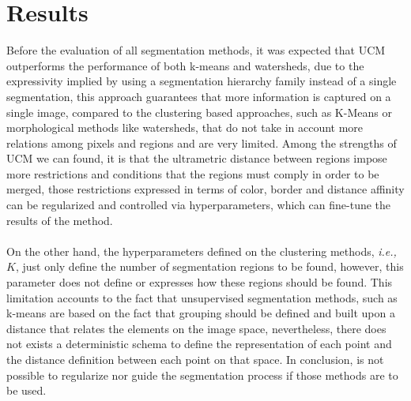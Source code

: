 \documentclass[10pt,twocolumn,letterpaper]{article}
\begin{document}
\section{Results}
Before the evaluation of all segmentation methods, it was expected that UCM outperforms the performance of both k-means and watersheds, due to the expressivity implied by using a segmentation hierarchy family instead of a single segmentation, this approach guarantees that more information is captured on a single image, compared to the clustering based approaches, such as K-Means or morphological methods like watersheds, that do not take in account more relations among pixels and regions and are very limited. Among the strengths of UCM we can found, it is that the ultrametric distance between regions impose more restrictions and conditions that the regions must comply in order to be merged, those restrictions expressed in terms of color, border and distance affinity can be regularized and controlled via hyperparameters, which can fine-tune the results of the method.
\\
\\
On the other hand, the hyperparameters defined on the clustering methods, \textit{i.e.,} $K$, just only define the number of segmentation regions to be found, however, this parameter does not define or expresses how these regions should be found. This limitation accounts to the fact that unsupervised segmentation methods, such as k-means are based on the fact that grouping should be defined and built upon a distance that relates the elements on the image space, nevertheless, there does not exists a deterministic schema to define the representation of each point and the distance definition between each point on that space. In conclusion, is not possible to regularize nor guide the segmentation process if those methods are to be used.
\\
\\
\end{document}
